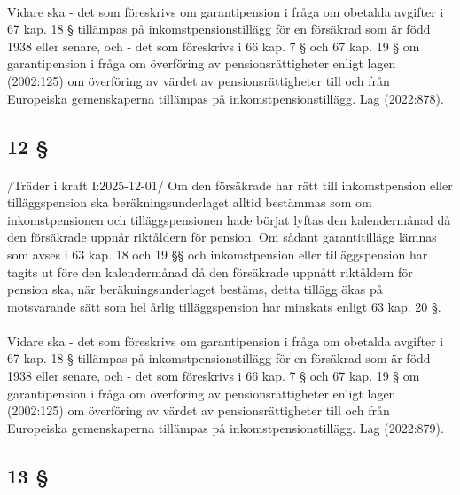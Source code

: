 \documentclass[a4paper,notitlepage,openany,10pt]{book}
\begin{document}
\paragraph*{}
Vidare ska
\newline - det som föreskrivs om garantipension i fråga om obetalda avgifter i 67 kap. 18 § tillämpas på inkomstpensionstillägg för en försäkrad som är född 1938 eller senare, och
\newline - det som föreskrivs i 66 kap. 7 § och 67 kap. 19 § om garantipension i fråga om överföring av pensionsrättigheter enligt lagen (2002:125) om överföring av värdet av pensionsrättigheter till och från Europeiska gemenskaperna tillämpas på inkomstpensionstillägg.
Lag (2022:878).
\subsection*{12 §}
\paragraph*{}
/Träder i kraft I:2025-12-01/
Om den försäkrade har rätt till inkomstpension eller tilläggspension ska beräkningsunderlaget alltid bestämmas som om inkomstpensionen och tilläggspensionen hade börjat lyftas den kalendermånad då den försäkrade uppnår riktåldern för pension. Om sådant garantitillägg lämnas som avses i 63 kap. 18 och 19 §§ och inkomstpension eller tilläggspension har tagits ut före den kalendermånad då den försäkrade uppnått riktåldern för pension ska, när beräkningsunderlaget bestäms, detta tillägg ökas på motsvarande sätt som hel årlig tilläggspension har minskats enligt 63 kap. 20 §.
\paragraph*{}
Vidare ska
\newline - det som föreskrivs om garantipension i fråga om obetalda avgifter i 67 kap. 18 § tillämpas på inkomstpensionstillägg för en försäkrad som är född 1938 eller senare, och
\newline - det som föreskrivs i 66 kap. 7 § och 67 kap. 19 § om garantipension i fråga om överföring av pensionsrättigheter enligt lagen (2002:125) om överföring av värdet av pensionsrättigheter till och från Europeiska gemenskaperna tillämpas på inkomstpensionstillägg.
Lag (2022:879).
\subsection*{13 §}
\end{document}
